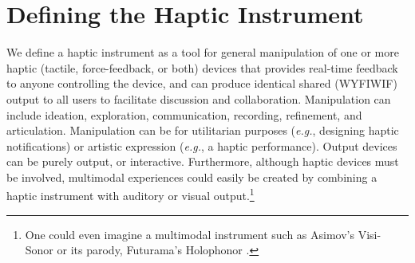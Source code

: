 %
% 
\section{Defining the Haptic Instrument}
We define a haptic instrument as a tool for general manipulation of one or more haptic (tactile, force-feedback, or both) devices that provides real-time feedback to anyone controlling the device, and can produce identical shared (WYFIWIF) output to all users to facilitate discussion and collaboration.
Manipulation can include ideation, exploration, communication, recording, refinement, and articulation.
Manipulation can be for utilitarian purposes (\emph{e.g.}, designing haptic notifications) or artistic expression (\emph{e.g.}, a haptic performance).
Output devices can be purely output, or interactive.
Furthermore, although haptic devices must be involved, multimodal experiences could easily be created by combining a haptic instrument with auditory or visual output.\footnote{One could even imagine a multimodal instrument such as Asimov's Visi-Sonor \cite{Asimov-Foundation-and-Empire} or its parody, Futurama's Holophonor \cite{Futurama-33-ParasitesLost}.}






